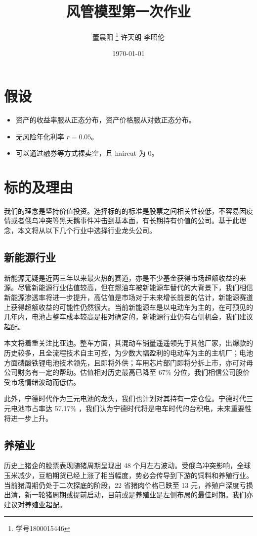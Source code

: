 \documentclass[a4paper,12pt]{ctexart}
\author{董晨阳 \thanks{学号1800015446} 许天朗 李昭伦}
\date{\today}
\title{风管模型第一次作业}
\begin{document}
\maketitle
\section{假设}
\label{sec:org9169128}
\begin{itemize}
\item 资产的收益率服从正态分布，资产价格服从对数正态分布。
\item 无风险年化利率 \(r=0.05\)。
\item 可以通过融券等方式裸卖空，且 haircut 为 0。
\end{itemize}
\section{标的及理由}
\label{sec:orgd733dea}
我们的理念是坚持价值投资。选择标的的标准是股票之间相关性较低，不容易因疫情或者俄乌冲突等黑天鹅事件冲击到基本面，有长期持有价值的公司。基于此理念，本文将从以下几个行业中选择行业龙头公司。
\subsection{新能源行业}
\label{sec:org96bce39}
新能源无疑是近两三年以来最火热的赛道，亦是不少基金获得市场超额收益的来源。尽管新能源行业估值较高，但在燃油车被新能源车替代的大背景下，我们相信新能源渗透率将进一步提升，高估值是市场对于未来增长前景的估计，新能源赛道上获得超额收益的可能性仍然很大。当前新能源车是以电动车为主的，在可预见的几年内，电池占整车成本较高是相对确定的，新能源行业仍有右侧机会，我们建议超配。

本文将着重关注比亚迪。整车方面，其混动车销量遥遥领先于其他厂家，出爆款的历史较多，且全流程技术自主可控，为少数大幅盈利的电动车为主的主机厂；电池方面磷酸铁锂电池技术领先，且即将外供；车用芯片部门即将分拆上市，亦可对母公司财务有一定的帮助。估值相对历史最高已降至 67\% 分位，我们相信公司股价受市场情绪波动而低估。

此外，宁德时代作为三元电池的龙头，我们也计划对其持有一定仓位。宁德时代三元电池市占率达 57.17\% ，我们认为宁德时代将是电车时代的台积电，未来重要性将进一步上升。
\subsection{养殖业}
\label{sec:org7387dee}
历史上猪企的股票表现随猪周期呈现出 48 个月左右波动。受俄乌冲突影响，全球玉米减少，豆粕期货已经上涨了相当幅度，势必会传导到下游的饲料和养殖行业。当前猪周期仍处于二次探底的阶段，22 省猪肉价格已跌至 13 元，养殖户深度亏损出清，新一轮猪周期或提前启动，目前或是养殖业是左侧布局的最佳时期。我们亦建议对养殖业超配。
\end{document}
